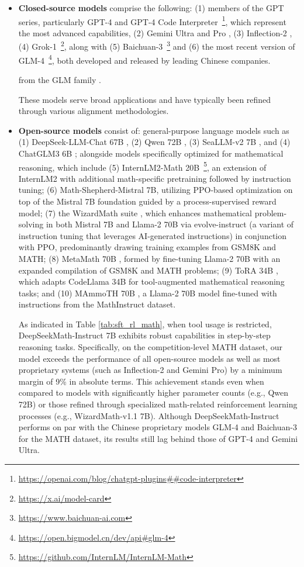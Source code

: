 \begin{itemize}[topsep=0pt]
\begin{itemize}[topsep=0pt]
    \item \textbf{Closed-source models} comprise the following: (1) members of the GPT series, particularly GPT-4 \citep{gpt4} and GPT-4 Code Interpreter~\footnote{\url{https://openai.com/blog/chatgpt-plugins\#\#code-interpreter}}, which represent the most advanced capabilities, (2) Gemini Ultra and Pro \citep{gemini}, (3) Inflection-2 \citep{inflection-2}, (4) Grok-1~\footnote{\url{https://x.ai/model-card}}, along with (5) Baichuan-3~\footnote{\url{https://www.baichuan-ai.com}} and (6) the most recent version of GLM-4~\footnote{\url{https://open.bigmodel.cn/dev/api\#glm-4}}, both developed and released by leading Chinese companies.

    from the GLM family \citep{glm}.

These models serve broad applications and have typically been refined through various alignment methodologies.

\item \textbf{Open-source models} consist of: general-purpose language models such as (1) DeepSeek-LLM-Chat 67B \citep{deepseek-llm}, (2) Qwen 72B \citep{qwen}, (3) SeaLLM-v2 7B \citep{seallm}, and (4) ChatGLM3 6B \citep{chatglm3}; alongside models specifically optimized for mathematical reasoning, which include (5) InternLM2-Math 20B~\footnote{\url{https://github.com/InternLM/InternLM-Math}}, an extension of InternLM2 with additional math-specific pretraining followed by instruction tuning; (6) Math-Shepherd-Mistral 7B, utilizing PPO-based optimization \citep{schulman2017proximal} on top of the Mistral 7B foundation \citep{mistral} guided by a process-supervised reward model; (7) the WizardMath suite \citep{wizardmath}, which enhances mathematical problem-solving in both Mistral 7B and Llama-2 70B \citep{llama2} via evolve-instruct (a variant of instruction tuning that leverages AI-generated instructions) in conjunction with PPO, predominantly drawing training examples from GSM8K and MATH; (8) MetaMath 70B \citep{metamath}, formed by fine-tuning Llama-2 70B with an expanded compilation of GSM8K and MATH problems; (9) ToRA 34B \cite{tora}, which adapts CodeLlama 34B for tool-augmented mathematical reasoning tasks; and (10) MAmmoTH 70B \citep{MathInstruct}, a Llama-2 70B model fine-tuned with instructions from the MathInstruct dataset.

As indicated in Table \ref{tab:sft_rl_math}, when tool usage is restricted, DeepSeekMath-Instruct 7B exhibits robust capabilities in step-by-step reasoning tasks. Specifically, on the competition-level MATH dataset, our model exceeds the performance of all open-source models as well as most proprietary systems (such as Inflection-2 and Gemini Pro) by a minimum margin of 9\% in absolute terms. This achievement stands even when compared to models with significantly higher parameter counts (e.g., Qwen 72B) or those refined through specialized math-related reinforcement learning processes (e.g., WizardMath-v1.1 7B). Although DeepSeekMath-Instruct performs on par with the Chinese proprietary models GLM-4 and Baichuan-3 for the MATH dataset, its results still lag behind those of GPT-4 and Gemini Ultra.


\end{itemize}
\end{itemize}
